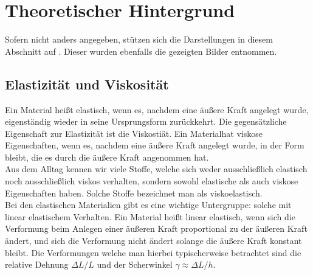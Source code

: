 \documentclass[11pt,a4paper,oneside]{scrartcl}
\begin{document}
\section{Theoretischer Hintergrund}
Sofern nicht anders angegeben, stützen sich die Darstellungen in diesem Abschnitt auf \cite{versuchsanleitung}. Dieser wurden ebenfalls die gezeigten Bilder entnommen.
\subsection{Elastizität und Viskosität}\label{elas_u_vis}
Ein Material heißt elastisch, wenn es, nachdem eine äußere Kraft angelegt wurde, eigenständig wieder in seine Ursprungsform zurückkehrt. Die gegensätzliche Eigenschaft zur Elastizität ist die Viskostiät. Ein Materialhat viskose Eigenschaften, wenn es, nachdem eine äußere Kraft angelegt wurde, in der Form bleibt, die es durch die äußere Kraft angenommen hat. \\ Aus dem Alltag kennen wir viele Stoffe, welche sich weder ausschließlich elastisch noch ausschließlich viskos verhalten, sondern sowohl elastische als auch viskose Eigenschaften haben. Solche Stoffe bezeichnet man als viskoelastisch. \\
Bei den elastischen Materialien gibt es eine wichtige Untergruppe: solche mit linear elastischem Verhalten. Ein Material heißt linear elastisch, wenn sich die Verformung beim Anlegen einer äußeren
Kraft proportional zu der äußeren Kraft ändert, und sich die Verformung nicht ändert solange die äußere Kraft konstant bleibt. Die Verformungen welche man hierbei typischerweise betrachtet sind die relative
Dehnung $\Delta L / L$ und der Scherwinkel $\gamma \approx \Delta L/ h$. 
\end{document}
